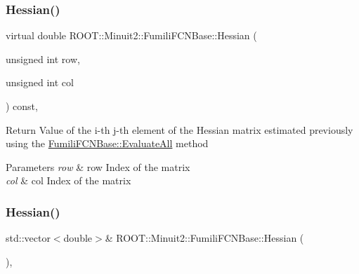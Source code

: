 \subsubsection{\texorpdfstring{Hessian()}{Hessian()}\hspace{0.1cm}{\footnotesize\ttfamily [3/6]}}
{\footnotesize\ttfamily virtual double R\+O\+O\+T\+::\+Minuit2\+::\+Fumili\+F\+C\+N\+Base\+::\+Hessian (\begin{DoxyParamCaption}\item[{unsigned int}]{row,  }\item[{unsigned int}]{col }\end{DoxyParamCaption}) const\hspace{0.3cm}{\ttfamily [inline]}, {\ttfamily [virtual]}}

Return Value of the i-\/th j-\/th element of the Hessian matrix estimated previously using the \mbox{\hyperlink{classROOT_1_1Minuit2_1_1FumiliFCNBase_a0741bb4a7405cc33ab60583472a189cb}{Fumili\+F\+C\+N\+Base\+::\+Evaluate\+All}} method 
\begin{DoxyParams}{Parameters}
{\em row} & row Index of the matrix \\
\hline
{\em col} & col Index of the matrix \\
\hline
\end{DoxyParams}
\mbox{\label{classROOT_1_1Minuit2_1_1FumiliFCNBase_ac90c52050c1f7557834e3fa82c2657f3}} 
\subsubsection{\texorpdfstring{Hessian()}{Hessian()}\hspace{0.1cm}{\footnotesize\ttfamily [4/6]}}
{\footnotesize\ttfamily std\+::vector$<$double$>$\& R\+O\+O\+T\+::\+Minuit2\+::\+Fumili\+F\+C\+N\+Base\+::\+Hessian (\begin{DoxyParamCaption}{ }\end{DoxyParamCaption})\hspace{0.3cm}{\ttfamily [inline]}, {\ttfamily [protected]}}

